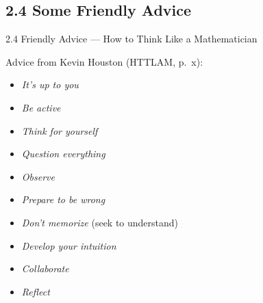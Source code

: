 \subsection{2.4 Some Friendly Advice}
\begin{frame}{2.4 Friendly Advice --- How to Think Like a Mathematician}

Advice from Kevin Houston (HTTLAM, p.~x):
	
	\begin{itemize}
		
			\item \emph{It’s up to you}
			
			\item  \emph{Be active}

			\item  \emph{Think for yourself}
			
			\item  \emph{Question everything} 
			
			\item  \emph{Observe} 
			
			\item  \emph{Prepare to be wrong}

			\item  \emph{Don't memorize} (seek to understand)
			
			\item  \emph{Develop your intuition}
			
			\item  \emph{Collaborate}
						
			\item  \emph{Reflect} 
			
		\end{itemize}
	

\end{frame}



